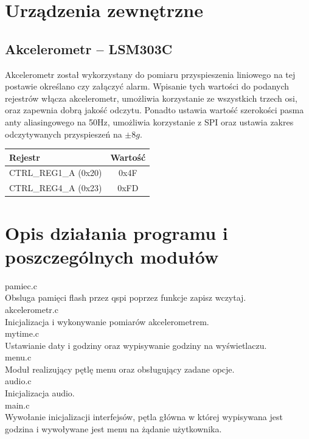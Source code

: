 \documentclass[10pt, a4paper]{article}
\begin{document}
\section{Urządzenia zewnętrzne}
\subsection{Akcelerometr -- LSM303C}
Akcelerometr został wykorzystany do pomiaru przyspieszenia liniowego na tej postawie określano czy załączyć alarm. Wpisanie tych wartości do podanych rejestrów włącza akcelerometr, umożliwia korzystanie ze wszystkich trzech osi, oraz zapewnia dobrą jakość odczytu. Ponadto ustawia wartość szerokości pasma anty aliasingowego na 50Hz, umożliwia korzystanie z SPI oraz ustawia zakres odczytywanych przyspieszeń na $\pm 8g$. \cite{man}
\begin{table}[H]
\centering
\begin{tabular}{|l|c|}
\hline 
\textbf{Rejestr} &\textbf{Wartość} \\ \hline \hline
CTRL\_REG1\_A (0x20) & 0x4F \\ \hline
CTRL\_REG4\_A (0x23) & 0xFD \\ \hline


\end{tabular}
\end{table}

\section{Opis działania programu i poszczególnych modułów}
pamiec.c\\
Obsluga pamięci flash przez qspi poprzez funkcje zapisz wczytaj.
\\  

akcelerometr.c\\
Inicjalizacja i wykonywanie pomiarów akcelerometrem.
\\  

mytime.c \\
Ustawianie daty i godziny oraz wypisywanie godziny na wyświetlaczu. \\  

menu.c\\
Moduł realizujący pętlę menu oraz obsługujący zadane opcje. \\ 

audio.c\\
Inicjalizacja audio. \\ 

main.c \\
Wywołanie inicjalizacji interfejsów, pętla główna w której wypisywana jest godzina i wywoływane jest menu na żądanie użytkownika. \\  
\end{document}
